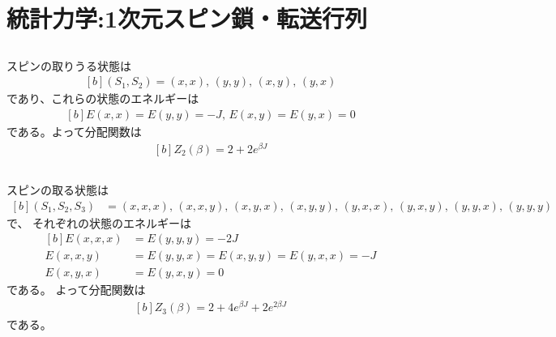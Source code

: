 \documentclass[../../sp_2018.tex]{subfiles}
\begin{document}
\setcounter{section}{1}
\section{統計力学:1次元スピン鎖・転送行列}
\subsection{}
スピンの取りうる状態は
\begin{equation}\begin{aligned}[b]
    (S_1,S_2) =(x,x),\,(y,y),\,(x,y),\,(y,x)
\end{aligned}\end{equation}
であり、これらの状態のエネルギーは
\begin{equation}\begin{aligned}[b]
    E(x,x)=E(y,y)=-J,\,E(x,y)=E(y,x)=0
\end{aligned}\end{equation}
である。よって分配関数は
\begin{equation}\begin{aligned}[b]
    Z_2(\beta)=2+2e^{\beta J}
\end{aligned}\end{equation}

\subsection{}
スピンの取る状態は
\begin{equation}\begin{aligned}[b]
    (S_1,S_2,S_3) &=(x,x,x),\,(x,x,y),\,(x,y,x),\,(x,y,y),\,
    (y,x,x),\,(y,x,y),\,(y,y,x),\,(y,y,y)
\end{aligned}\end{equation}
で、
それぞれの状態のエネルギーは
\begin{equation}\begin{aligned}[b]
    E(x,x,x)&=E(y,y,y)=-2J\\
    E(x,x,y)&=E(y,y,x)=E(x,y,y)=E(y,x,x)=-J\\
    E(x,y,x)&=E(y,x,y)=0
\end{aligned}\end{equation}
である。
よって分配関数は
\begin{equation}\begin{aligned}[b]
    Z_3(\beta)=2+4e^{\beta J}+2e^{2\beta J}
\end{aligned}\end{equation}
である。
\end{document}
